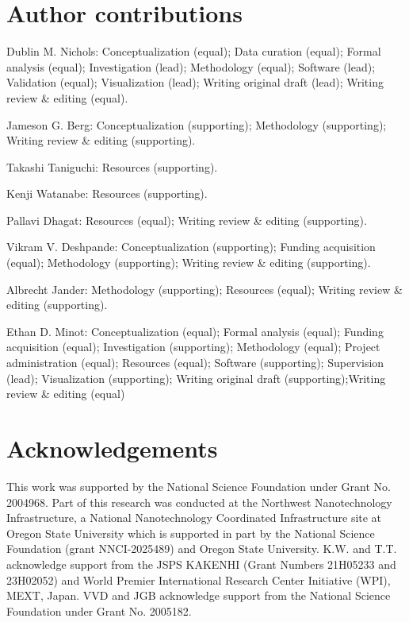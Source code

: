 \documentclass[double,12pt,1in,seploa]{beavtex}
\let\Oldsection\section
\renewcommand{\section}{\FloatBarrier\Oldsection}
\begin{document}
\section{Author contributions}

Dublin M. Nichols: Conceptualization (equal); Data curation (equal); Formal analysis (equal); Investigation (lead); Methodology (equal); Software (lead); Validation (equal); Visualization (lead); Writing \textemdash original draft (lead); Writing \textemdash review \& editing (equal). 

\noindent
Jameson G. Berg: Conceptualization (supporting); Methodology (supporting); Writing \textemdash review \& editing (supporting). 

\noindent
Takashi Taniguchi: Resources (supporting). 

\noindent
Kenji Watanabe: Resources (supporting). 

\noindent
Pallavi Dhagat: Resources (equal); Writing \textemdash review \& editing (supporting). 

\noindent
Vikram V. Deshpande: Conceptualization (supporting); Funding acquisition (equal); Methodology (supporting); Writing \textemdash review \& editing (supporting). 

\noindent
Albrecht Jander: Methodology (supporting); Resources (equal); Writing \textemdash review \& editing (supporting). 

\noindent
Ethan D. Minot: Conceptualization (equal); Formal analysis (equal); Funding acquisition (equal); Investigation (supporting); Methodology (equal); Project administration (equal); Resources (equal); Software (supporting); Supervision (lead); Visualization (supporting); Writing \textemdash original draft (supporting);Writing \textemdash review \& editing (equal)

\section{Acknowledgements}
This work was supported by the National Science Foundation under Grant No. 2004968. Part of this research was conducted at the Northwest Nanotechnology Infrastructure, a National Nanotechnology Coordinated Infrastructure site at Oregon State University which is supported in part by the National Science Foundation (grant NNCI-2025489) and Oregon State University.
K.W. and T.T. acknowledge support from the JSPS KAKENHI (Grant Numbers 21H05233 and 23H02052) and World Premier International Research Center Initiative (WPI), MEXT, Japan. 
VVD and JGB acknowledge support from the National Science Foundation under Grant No. 2005182.
\end{document}
